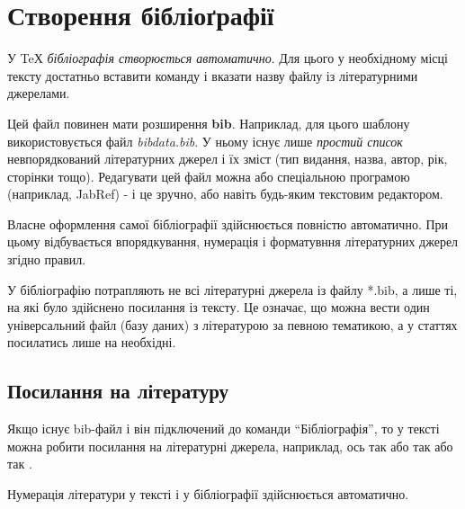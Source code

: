 
\chapter{Створення бібліоґрафії}

У TeХ \emph{бібліографія створюється автоматично}. Для цього у необхідному місці тексту достатньо вставити команду \verb|| і вказати назву файлу із літературними джерелами. 

Цей файл повинен мати розширення \textbf{bib}. Наприклад, для цього шаблону використовується файл \emph{bibdata.bib}. У ньому існує лише \emph{простий список} невпорядкований літературних джерел і їх
зміст (тип видання, назва, автор, рік, сторінки тощо). Редагувати цей файл можна або спеціальною програмою (наприклад, JabRef) - і це зручно, або навіть будь-яким текстовим редактором. 

Власне оформлення самої бібліографії здійснюється повністю автоматично. При цьому відбувається впорядкування, нумерація і форматувння літературних джерел згідно правил. 

У бібліографію потрапляють не всі літературні джерела із файлу {*}.bib, а лише ті, на які було здійснено посилання із тексту. Це означає, що можна вести один універсальний файл (базу даних) з літературою за певною тематикою, а у статтях посилатись лише на необхідні.

\section{Посилання на літературу}

Якщо існує bib-файл і він підключений до команди ``Бібліографія'', то у тексті можна робити посилання на літературні джерела, наприклад, ось так \cite{WinNT} або так \cite{Vasylenko92, Afanasyev92} або так \cite{Makilov91, Ponomarenko86, Belousova81, Tezisy, Statia, GOST7184}.

Нумерація літератури у тексті і у бібліографії здійснюється автоматично. 

